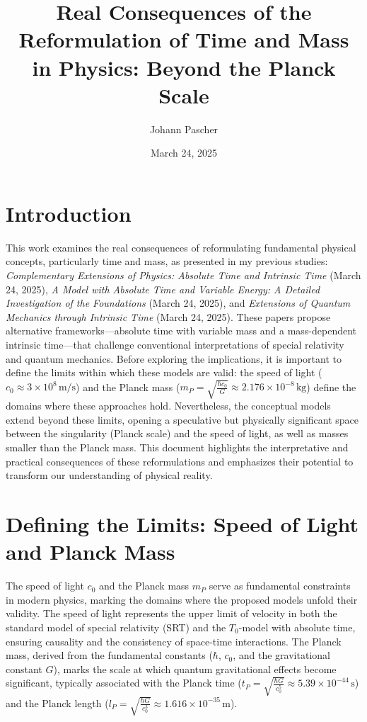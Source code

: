 \documentclass[a4paper,12pt]{article}
\begin{document}
	
	\title{Real Consequences of the Reformulation of Time and Mass in Physics: Beyond the Planck Scale}
	\author{Johann Pascher}
	\date{March 24, 2025}
	\maketitle
	
	\tableofcontents %
	\newpage %
	
	\section{Introduction}
	This work examines the real consequences of reformulating fundamental physical concepts, particularly time and mass, as presented in my previous studies: \textit{Complementary Extensions of Physics: Absolute Time and Intrinsic Time} (March 24, 2025), \textit{A Model with Absolute Time and Variable Energy: A Detailed Investigation of the Foundations} (March 24, 2025), and \textit{Extensions of Quantum Mechanics through Intrinsic Time} (March 24, 2025). These papers propose alternative frameworks—absolute time with variable mass and a mass-dependent intrinsic time—that challenge conventional interpretations of special relativity and quantum mechanics. Before exploring the implications, it is important to define the limits within which these models are valid: the speed of light (\( c_0 \approx 3 \times 10^8 \, \text{m/s} \)) and the Planck mass (\( m_P = \sqrt{\frac{\hbar c_0}{G}} \approx 2.176 \times 10^{-8} \, \text{kg} \)) define the domains where these approaches hold. Nevertheless, the conceptual models extend beyond these limits, opening a speculative but physically significant space between the singularity (Planck scale) and the speed of light, as well as masses smaller than the Planck mass. This document highlights the interpretative and practical consequences of these reformulations and emphasizes their potential to transform our understanding of physical reality.
	
	\section{Defining the Limits: Speed of Light and Planck Mass}
	The speed of light \( c_0 \) and the Planck mass \( m_P \) serve as fundamental constraints in modern physics, marking the domains where the proposed models unfold their validity. The speed of light represents the upper limit of velocity in both the standard model of special relativity (SRT) and the \( T_0 \)-model with absolute time, ensuring causality and the consistency of space-time interactions. The Planck mass, derived from the fundamental constants (\( \hbar \), \( c_0 \), and the gravitational constant \( G \)), marks the scale at which quantum gravitational effects become significant, typically associated with the Planck time (\( t_P = \sqrt{\frac{\hbar G}{c_0^5}} \approx 5.39 \times 10^{-44} \, \text{s} \)) and the Planck length (\( l_P = \sqrt{\frac{\hbar G}{c_0^3}} \approx 1.616 \times 10^{-35} \, \text{m} \)).
	
\end{document}

